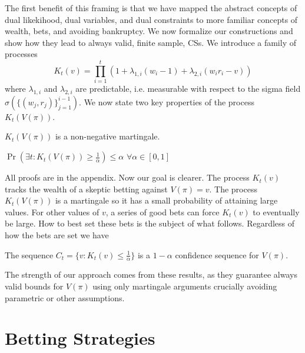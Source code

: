 The first
benefit of this framing is that we have 
mapped the abstract concepts of dual likekihood,
dual variables, and dual constraints to more familiar 
concepts of wealth, bets, and avoiding bankruptcy. 
We now formalize our constructions and
show how they lead to always valid, finite sample, 
CSs. We introduce a family of processes
\[
K_t(v) = \prod_{i=1}^t (1+\lambda_{1,i} (w_i-1) +\lambda_{2,i}(w_i r_i - v))
\]
where $\lambda_{1,i}$ and $\lambda_{2,i}$ are predictable, i.e. measurable
with respect to the sigma field $\sigma(\{(w_j,r_j)\}_{j=1}^{i-1})$.
We now state two key properties of the process $K_t(V(\pi))$.
\begin{theorem}
\label{thm:martingale}
$K_t(V(\pi))$ is a non-negative martingale.
\end{theorem}
\begin{theorem}
\label{thm:ville}
$\Pr(\exists t: K_t(V(\pi)) \geq \frac{1}{\alpha})\leq \alpha$
$\forall \alpha \in [0,1]$
\end{theorem}
All proofs are in the appendix.
Now our goal is clearer. The process $K_t(v)$ tracks the wealth
of a skeptic betting against
$V(\pi)=v$. The process $K_t(V(\pi))$ is a martingale so it has
a small probability of attaining large values. For other values 
of $v$, a series of good bets can force $K_t(v)$ to eventually
be large. How to best set these bets is the subject of what follows.
Regardless of how the bets are set we have
\begin{theorem}
\label{thm:cs}
The sequence $C_t = \{v:K_t(v)\leq \frac{1}{\alpha}\}$ is a $1-\alpha$ confidence sequence for $V(\pi)$.
\end{theorem}
The strength of our approach comes from these results, as they 
guarantee always valid bounds for $V(\pi)$ using only martingale
arguments crucially avoiding parametric or other assumptions.

\section{Betting Strategies}

